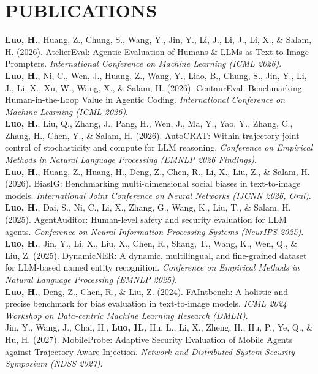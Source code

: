 \documentclass[a4paper,9pt]{extarticle}
\begin{document}
\section*{PUBLICATIONS}
\noindent
\textbf{Luo, H.}, Huang, Z., Chung, S., Wang, Y., Jin, Y., Li, J., Li, J., Li, X., \& Salam, H. (2026). AtelierEval: Agentic Evaluation of Humans \& LLMs as Text-to-Image Prompters. \textit{International Conference on Machine Learning (ICML 2026)}.\\[4pt]
\noindent
\textbf{Luo, H.}, Ni, C., Wen, J., Huang, Z., Wang, Y., Liao, B., Chung, S., Jin, Y., Li, J., Li, X., Xu, W., Wang, X., \& Salam, H. (2026). CentaurEval: Benchmarking Human-in-the-Loop Value in Agentic Coding. \textit{International Conference on Machine Learning (ICML 2026)}.\\[4pt]
\noindent
\textbf{Luo, H.}, Liu, Q., Zhang, J., Pang, H., Wen, J., Ma, Y., Yao, Y., Zhang, C., Zhang, H., Chen, Y., \& Salam, H. (2026). AutoCRAT: Within-trajectory joint control of stochasticity and compute for LLM reasoning. \textit{Conference on Empirical Methods in Natural Language Processing (EMNLP 2026 Findings)}.\\[4pt]
\noindent
\textbf{Luo, H.}, Huang, Z., Huang, H., Deng, Z., Chen, R., Li, X., Liu, Z., \& Salam, H. (2026). BiasIG: Benchmarking multi-dimensional social biases in text-to-image models. \textit{International Joint Conference on Neural Networks (IJCNN 2026, Oral)}.\\[4pt]
\noindent
\textbf{Luo, H.}, Dai, S., Ni, C., Li, X., Zhang, G., Wang, K., Liu, T., \& Salam, H. (2025). AgentAuditor: Human-level safety and security evaluation for LLM agents. \textit{Conference on Neural Information Processing Systems (NeurIPS 2025)}.\\[4pt]
\noindent
\textbf{Luo, H.}, Jin, Y., Li, X., Liu, X., Chen, R., Shang, T., Wang, K., Wen, Q., \& Liu, Z. (2025). DynamicNER: A dynamic, multilingual, and fine-grained dataset for LLM-based named entity recognition. \textit{Conference on Empirical Methods in Natural Language Processing (EMNLP 2025)}.\\[4pt]
\noindent
\textbf{Luo, H.}, Deng, Z., Chen, R., \& Liu, Z. (2024). FAIntbench: A holistic and precise benchmark for bias evaluation in text-to-image models. \textit{ICML 2024 Workshop on Data-centric Machine Learning Research (DMLR)}.\\[4pt]
\noindent
Jin, Y., Wang, J., Chai, H., \textbf{Luo, H.}, Hu, L., Li, X., Zheng, H., Hu, P., Ye, Q., \& Hu, H. (2027). MobileProbe: Adaptive Security Evaluation of Mobile Agents against Trajectory-Aware Injection. \textit{Network and Distributed System Security Symposium (NDSS 2027)}.\\[4pt]
\end{document}
